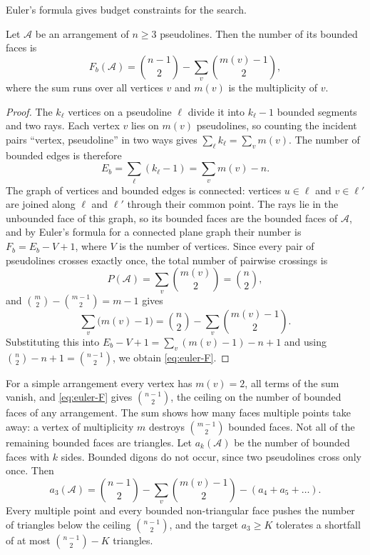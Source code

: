 Euler's formula gives budget constraints for the search.

\begin{lemma}\label{lem:faces}
Let $\mathcal A$ be an arrangement of $n\ge3$ pseudolines.
Then the number of its bounded faces is
\begin{equation}\label{eq:euler-F}
F_b(\mathcal A)=\binom{n-1}2-\sum_v\binom{m(v)-1}2,
\end{equation}
where the sum runs over all vertices $v$ and $m(v)$ is the multiplicity of $v$.
\end{lemma}

\begin{proof}
The $k_\ell$ vertices on a pseudoline $\ell$ divide it into $k_\ell-1$ bounded segments and two rays.
Each vertex $v$ lies on $m(v)$ pseudolines, so counting the incident pairs ``vertex, pseudoline'' in two ways gives $\sum_\ell k_\ell=\sum_v m(v)$. The number of bounded edges is therefore
\begin{equation}\label{eq:edges}
E_b=\sum_\ell(k_\ell-1)=\sum_v m(v)-n.
\end{equation}
The graph of vertices and bounded edges is connected: vertices $u\in\ell$ and $v\in\ell'$ are joined along $\ell$ and $\ell'$ through their common point.
The rays lie in the unbounded face of this graph, so its bounded faces are the bounded faces of $\mathcal A$, and by Euler's formula for a connected plane graph their number is $F_b=E_b-V+1$, where $V$ is the number of vertices.
Since every pair of pseudolines crosses exactly once, the total number of pairwise crossings is
\begin{equation}\label{eq:pair-cross}
P(\mathcal{A})=\sum_v\binom{m(v)}2=\binom n2,
\end{equation}
and $\binom m2-\binom{m-1}2=m-1$ gives
\[
\sum_v\bigl(m(v)-1\bigr)=\binom n2-\sum_v\binom{m(v)-1}2 .
\]
Substituting this into $E_b-V+1=\sum_v(m(v)-1)-n+1$ and using $\binom n2-n+1=\binom{n-1}2$, we obtain \eqref{eq:euler-F}.
\end{proof}

For a simple arrangement every vertex has $m(v)=2$, all terms of the sum vanish, and \eqref{eq:euler-F} gives $\binom{n-1}2$, the ceiling on the number of bounded faces of any arrangement. The sum shows how many faces multiple points take away: a vertex of multiplicity $m$ destroys $\binom{m-1}2$ bounded faces. Not all of the remaining bounded faces are triangles. Let $a_k(\mathcal A)$ be the number of bounded faces with $k$ sides. Bounded digons do not occur, since two pseudolines cross only once. Then
\begin{equation}\label{eq:a3-split}
a_3(\mathcal A)=\binom{n-1}2-\sum_v\binom{m(v)-1}2-(a_4+a_5+\ldots).
\end{equation}
Every multiple point and every bounded non-triangular face pushes the number of triangles below the ceiling $\binom{n-1}2$, and the target $a_3\ge K$ tolerates a shortfall of at most $\binom{n-1}2-K$ triangles.

